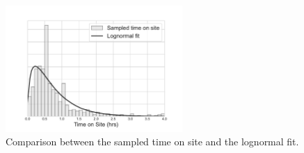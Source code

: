 \documentclass[preprint,12pt]{elsarticle}
\begin{document}
\begin{figure}[ht] \centering
\includegraphics[width=0.6\textwidth]{img/time_on_site_fit.pdf}
\caption{Comparison between the sampled time on site and the lognormal fit.}
\label{fig:lognorm_fit} \end{figure}






\end{document}
